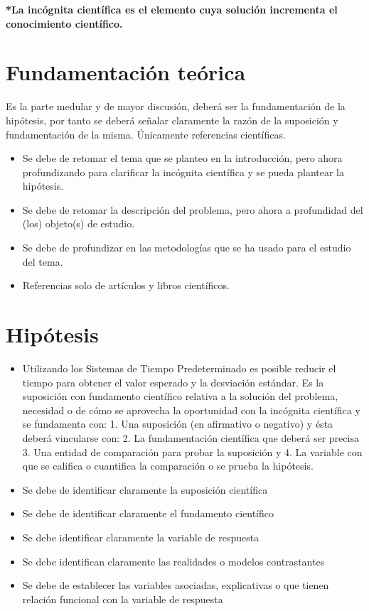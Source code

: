     \textbf{*La incógnita científica es el elemento cuya solución incrementa el conocimiento
    científico.}
    \section{Fundamentación teórica}
    
    Es la parte medular y de mayor discusión, deberá ser la fundamentación de la hipótesis, por tanto se deberá señalar claramente la razón de la suposición y fundamentación de la misma. Únicamente referencias científicas.
    \begin{itemize}
        \item Se debe de retomar el tema que se planteo en la introducción, pero ahora profundizando para clarificar la incógnita científica y se pueda plantear la hipótesis.
        \item Se debe de retomar la descripción del problema, pero ahora a profundidad del (los) objeto(s) de estudio.
        \item Se debe de profundizar en las metodologías que se ha usado para el estudio del tema.
        \item Referencias solo de artículos y libros científicos.
    \end{itemize}
    \section{Hipótesis}
    
    \begin{itemize}
    \item Utilizando los Sistemas de Tiempo Predeterminado es posible reducir el tiempo para obtener el valor esperado y la desviación estándar.
    Es la suposición con fundamento científico relativa a la solución del problema, necesidad o de cómo se aprovecha la oportunidad con la incógnita científica y se fundamenta con: 1. Una suposición (en afirmativo o negativo) y ésta deberá vincularse con:
    2. La fundamentación científica que deberá ser precisa 3. Una entidad de comparación para probar la suposición y
    4. La variable con que se califica o cuantifica la comparación o se prueba la hipótesis.
    
        \item Se debe de identificar claramente la suposición científica
        \item Se debe de identificar claramente el fundamento científico
        \item Se debe identificar claramente la variable de respuesta
        \item Se debe identifican claramente las realidades o modelos contrastantes
        \item Se debe de establecer las variables asociadas, explicativas o que tienen relación funcional con la variable de respuesta
    \end{itemize}
